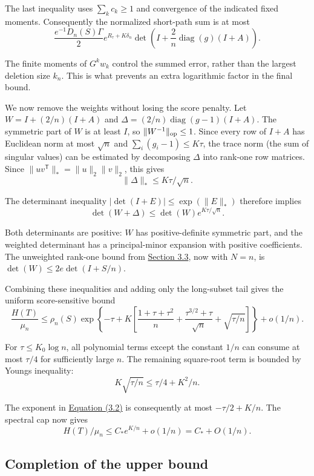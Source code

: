 \documentclass[11pt,a4paper]{article}
\newcommand{\paperref}[2]{\hyperref[#1]{#2}}
\begin{document}
The last inequality uses \(\sum_k c_k\ge1\) and convergence of the indicated fixed moments. Consequently the normalized short-path sum is at most
\[\frac{e^{-1}D_n(S)\Gamma}{2}
e^{R_\tau+K\delta_n}
\det\left(I+\frac2n\operatorname{diag}(g)(I+A)\right).\]

The finite moments of \(G^kw_k\) control the summed error, rather than the largest deletion size \(k_n\). This is what prevents an extra logarithmic factor in the final bound.

We now remove the weights without losing the score penalty. Let \(W=I+(2/n)(I+A)\) and \(\Delta=(2/n)\operatorname{diag}(g-1)(I+A)\). The symmetric part of \(W\) is at least \(I\), so \(\|W^{-1}\|_{\rm op}\le1\). Since every row of \(I+A\) has Euclidean norm at most \(\sqrt n\) and \(\sum_i(g_i-1)\le K\tau\), the trace norm (the sum of singular values) can be estimated by decomposing \(\Delta\) into rank-one row matrices. Since \(\|uv^{\mathsf T}\|_*=\|u\|_2\|v\|_2\), this gives
\[\|\Delta\|_*\le K\tau/\sqrt n.\]

The determinant inequality \(|\det(I+E)|\le\exp(\|E\|_*)\) therefore implies
\[\det(W+\Delta)\le\det(W)e^{K\tau/\sqrt n}.\]

Both determinants are positive: \(W\) has positive-definite symmetric part, and the weighted determinant has a principal-minor expansion with positive coefficients. The unweighted rank-one bound from \paperref{sec-3.3}{Section 3.3}, now with \(N=n\), is \(\det(W)\le2e\det(I+S/n)\).

Combining these inequalities and adding only the long-subset tail gives the uniform score-sensitive bound
\begin{equation}
\frac{H(T)}{\mu_n}\le
\rho_n(S)\exp\left\{-\tau+
K\left[\frac{1+\tau+\tau^2}{n}
+\frac{\tau^{3/2}+\tau}{\sqrt n}+\sqrt{\tau/n}\right]\right\}
+o(1/n).
\tag{3.2}\label{eq-score-penalty}
\end{equation}

For \(\tau\le K_0\log n\), all polynomial terms except the constant \(1/n\) can consume at most \(\tau/4\) for sufficiently large \(n\). The remaining square-root term is bounded by Young\textquotesingle s inequality:
\[K\sqrt{\tau/n}\le\tau/4+K^2/n.\]

The exponent in \paperref{eq-score-penalty}{Equation (3.2)} is consequently at most \(-\tau/2+K/n\). The spectral cap now gives
\[H(T)/\mu_n\le C_*e^{K/n}+o(1/n)=C_*+O(1/n).\]

\subsection{Completion of the upper bound}\label{sec-3.5}
\end{document}
